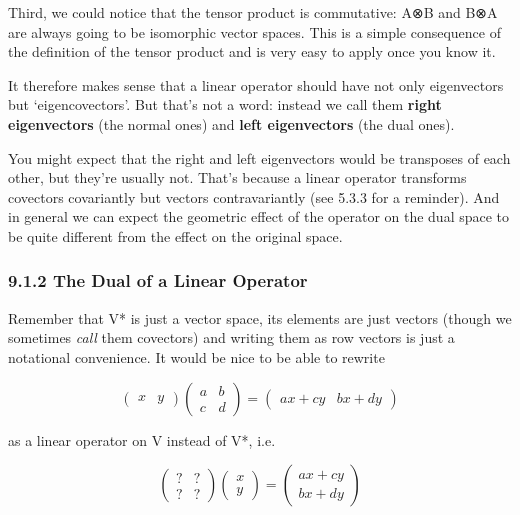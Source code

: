 \documentclass[oneside,english]{amsbook}
\numberwithin{section}{chapter}
\theoremstyle{plain}
\theoremstyle{definition}
\begin{document}
Third, we could notice that the tensor product is commutative: A⊗B and
B⊗A are always going to be isomorphic vector spaces. This is a simple
consequence of the definition of the tensor product and is very easy to
apply once you know it.

It therefore makes sense that a linear operator should have not only
eigenvectors but `eigencovectors'. But that's not a word: instead we
call them \textbf{right eigenvectors} (the normal ones) and \textbf{left
	eigenvectors} (the dual ones).

You might expect that the right and left eigenvectors would be
transposes of each other, but they're usually not. That's because a
linear operator transforms covectors covariantly but vectors
contravariantly (see 5.3.3 for a reminder). And in general we can expect
the geometric effect of the operator on the dual space to be quite
different from the effect on the original space.

\subsubsection{9.1.2 The Dual of a Linear
	Operator}\label{the-dual-of-a-linear-operator}

Remember that V* is just a vector space, its elements are just vectors
(though we sometimes \emph{call} them covectors) and writing them as row
vectors is just a notational convenience. It would be nice to be able to
rewrite

\[\begin{pmatrix}
	x & y
\end{pmatrix}\begin{pmatrix}
	a & b \\
	c & d
\end{pmatrix} = \begin{pmatrix}
	ax + cy & bx + dy
\end{pmatrix}\]

as a linear operator on V instead of V*, i.e.

\[\begin{pmatrix}
	? & ? \\
	? & ?
\end{pmatrix}\begin{pmatrix}
	x \\
	y
\end{pmatrix} = \begin{pmatrix}
	ax + cy \\
	bx + dy
\end{pmatrix}\]
\end{document}
